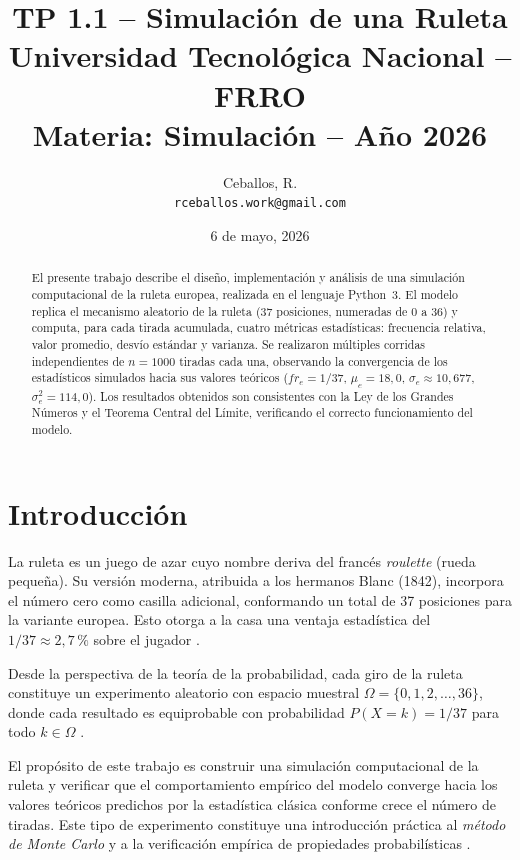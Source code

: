 \documentclass[a4paper, 11pt]{article}
\title{%
  \textbf{TP 1.1 -- Simulación de una Ruleta} \\[6pt]
  \large Universidad Tecnológica Nacional -- FRRO \\
  \large Materia: Simulación -- Año 2026
}
\author{
  Ceballos, R. \\
  \texttt{rceballos.work@gmail.com}
}
\date{6 de mayo, 2026}
\begin{document}
\maketitle

\begin{abstract}
El presente trabajo describe el diseño, implementación y análisis de una
simulación computacional de la ruleta europea, realizada en el lenguaje
Python~3. El modelo replica el mecanismo aleatorio de la ruleta (37 posiciones,
numeradas de 0 a 36) y computa, para cada tirada acumulada, cuatro métricas
estadísticas: frecuencia relativa, valor promedio, desvío estándar y varianza.
Se realizaron múltiples corridas independientes de $n = 1000$ tiradas cada una,
observando la convergencia de los estadísticos simulados hacia sus valores
teóricos ($fr_e = 1/37$, $\mu_e = 18{,}0$, $\sigma_e \approx 10{,}677$,
$\sigma^2_e = 114{,}0$). Los resultados obtenidos son consistentes con la Ley
de los Grandes Números y el Teorema Central del Límite, verificando el correcto
funcionamiento del modelo.
\end{abstract}

\section{Introducción}

La ruleta es un juego de azar cuyo nombre deriva del francés \textit{roulette}
(rueda pequeña). Su versión moderna, atribuida a los hermanos Blanc (1842),
incorpora el número cero como casilla adicional, conformando un total de
37 posiciones para la variante europea. Esto otorga a la casa una ventaja
estadística del $1/37 \approx 2{,}7\,\%$ sobre el jugador
\cite{wikipedia_ruleta}.

Desde la perspectiva de la teoría de la probabilidad, cada giro de la ruleta
constituye un experimento aleatorio con espacio muestral $\Omega = \{0, 1, 2,
\ldots, 36\}$, donde cada resultado es equiprobable con probabilidad $P(X = k)
= 1/37$ para todo $k \in \Omega$ \cite{ross2014introduction}.

El propósito de este trabajo es construir una simulación computacional de la
ruleta y verificar que el comportamiento empírico del modelo converge hacia
los valores teóricos predichos por la estadística clásica conforme crece el
número de tiradas. Este tipo de experimento constituye una introducción
práctica al \textit{método de Monte Carlo} y a la verificación empírica de
propiedades probabilísticas \cite{walpole2012probabilidad}.
\end{document}
